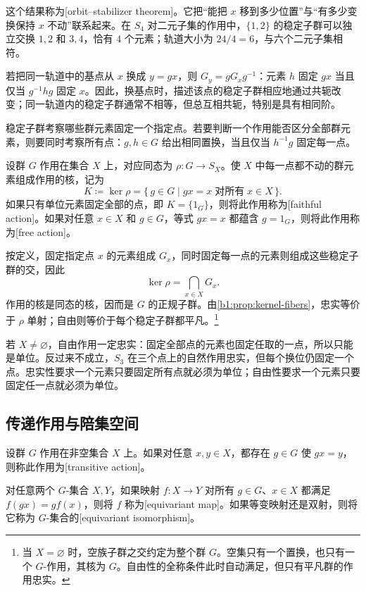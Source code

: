 这个结果称为[orbit--stabilizer theorem]。它把“能把 \(x\) 移到多少位置”与“有多少变换保持 \(x\) 不动”联系起来。在 \(S_4\) 对二元子集的作用中，\(\{1,2\}\) 的稳定子群可以独立交换 \(1,2\) 和 \(3,4\)，恰有 \(4\) 个元素；轨道大小为 \(24/4=6\)，与六个二元子集相符。

\ProseParagraphBreak
若把同一轨道中的基点从 \(x\) 换成 \(y=gx\)，则 \(G_y=gG_xg^{-1}\)：元素 \(h\) 固定 \(gx\) 当且仅当 \(g^{-1}hg\) 固定 \(x\)。因此，换基点时，描述该点的稳定子群相应地通过共轭改变；同一轨道内的稳定子群通常不相等，但总互相共轭，特别是具有相同阶。

\ProseParagraphBreak
稳定子群考察哪些群元素固定一个指定点。若要判断一个作用能否区分全部群元素，则要同时考察所有点：\(g,h\in G\) 给出相同置换，当且仅当 \(h^{-1}g\) 固定每一点。

\begin{definition}\label{b1:def:faithful-action}
	设群 \(G\) 作用在集合 \(X\) 上，对应同态为 \(\rho:G\rightarrow S_X\)。使 \(X\) 中每一点都不动的群元素组成作用的核，记为
	\[
		K\coloneqq\ker\rho =\{\,g\in G\mid gx=x\;\text{对所有}\;x\in X\,\}.
	\]
	如果只有单位元素固定全部的点，即 \(K=\{1_G\}\)，则将此作用称为[faithful action]。如果对任意 \(x\in X\) 和 \(g\in G\)，等式 \(gx=x\) 都蕴含 \(g=1_G\)，则将此作用称为[free action]。
\end{definition}

按定义，固定指定点 \(x\) 的元素组成 \(G_x\)，同时固定每一点的元素则组成这些稳定子群的交，因此
\[
	\ker\rho=\bigcap_{x\in X}G_x.
\]
作用的核是同态的核，因而是 \(G\) 的正规子群。由\cref{b1:prop:kernel-fibers}，忠实等价于 \(\rho\) 单射；自由则等价于每个稳定子群都平凡。\footnote{当 \(X=\varnothing\) 时，空族子群之交约定为整个群 \(G\)。空集只有一个置换，也只有一个 \(G\)-作用，其核为 \(G\)。自由性的全称条件此时自动满足，但只有平凡群的作用忠实。}

\ProseParagraphBreak
若 \(X\ne\varnothing\)，自由作用一定忠实：固定全部点的元素也固定任取的一点，所以只能是单位。反过来不成立，\(S_3\) 在三个点上的自然作用忠实，但每个换位仍固定一个点。忠实性要求一个元素只要固定所有点就必须为单位；自由性要求一个元素只要固定任一点就必须为单位。

\subsection{传递作用与陪集空间}
\label{b1:subsec:0401:03}

\begin{definition}\label{b1:def:transitive-action}
	设群 \(G\) 作用在非空集合 \(X\) 上。如果对任意 \(x,y\in X\)，都存在 \(g\in G\) 使 \(gx=y\)，则称此作用为[transitive action]。

	对任意两个 \(G\)-集合 \(X,Y\)，如果映射 \(f:X\rightarrow Y\) 对所有 \(g\in G\)、\(x\in X\) 都满足 \(f(gx)=gf(x)\)，则将 \(f\) 称为[equivariant map]。如果等变映射还是双射，则将它称为 \(G\)-集合的[equivariant isomorphism]。
\end{definition}


